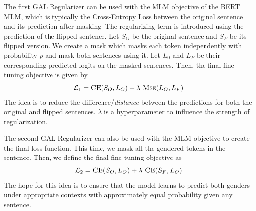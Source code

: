 \documentclass[10pt,twocolumn,letterpaper]{article}
\begin{document}
The first GAL Regularizer can be used with the MLM objective of the BERT MLM, which is typically the Cross-Entropy Loss between the original sentence and its prediction after masking.
The regularizing term is introduced using the prediction of the flipped sentence.
Let $S_{O}$ be the original sentence and $S_{F}$ be its flipped version.
We create a mask which masks each token independently with probability $p$ and mask both sentences using it.
Let $L_{0}$ and $L_{F}$ be their corresponding predicted logits on the masked sentences.
Then, the final fine-tuning objective is given by
\begin{equation}
    \mathcal{L}_{1} = \textsc{CE}(S_{O}, L_{O}) + \lambda \ \textsc{Mse}(L_{O}, L_{F})
\end{equation}
The idea is to reduce the difference/\textit{distance} between the predictions for both the original and flipped sentences.
$\lambda$ is a hyperparameter to influence the strength of regularization.

The second GAL Regularizer can also be used with the MLM objective to create the final loss function.
This time, we mask all the gendered tokens in the sentence.
Then, we define the final fine-tuning objective as
\begin{equation}
    \mathcal{L}_{2} = \textsc{CE}(S_{O}, L_{O}) + \lambda \ \textsc{CE}(S_{F}, L_{O})
\end{equation}
The hope for this idea is to ensure that the model learns to predict both genders under appropriate contexts with approximately equal probability given any sentence.
\end{document}
